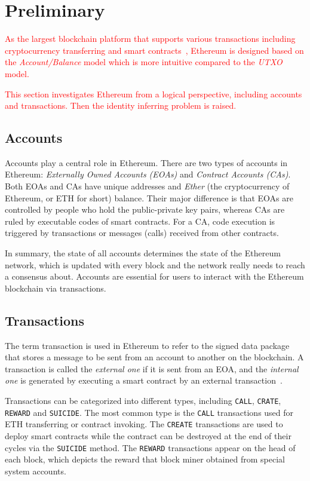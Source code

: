 
\section{Preliminary}
\label{sec:preliminary}
\textcolor{red}{As the largest blockchain platform that supports various transactions including cryptocurrency transferring and smart contracts~\cite{chen2018infocom}, Ethereum is designed based on the \emph{Account/Balance} model which is more intuitive compared to the \emph{UTXO} model.}

\textcolor{red}{This section investigates Ethereum from a logical perspective, including accounts and transactions. Then the identity inferring problem is raised.} 

\subsection{Accounts}
Accounts play a central role in Ethereum. There are two types of accounts in Ethereum: \emph{Externally Owned Accounts (EOAs)} and \emph{Contract Accounts (CAs)}. Both EOAs and CAs have unique addresses and \emph{Ether} (the cryptocurrency of Ethereum, or ETH for short) balance. Their major difference is that EOAs are controlled by people who hold the public-private key pairs, whereas CAs are ruled by executable codes of smart contracts. For a CA, code execution is triggered by transactions or messages (calls) received from other contracts. 

In summary, the state of all accounts determines the state of the Ethereum network, which is updated with every block and the network really needs to reach a consensus about. Accounts are essential for users to interact with the Ethereum blockchain via transactions.
 
 \subsection{Transactions}
 The term transaction is used in Ethereum to refer to the signed data package that stores a message to be sent from an account to another on the blockchain. A transaction is called the \emph{external one} if it is sent from an EOA, and the \emph{internal one} is generated by executing a smart contract by an external transaction~\cite{chen2018infocom}.

Transactions can be categorized into different types, including \texttt{CALL}, \texttt{CRATE}, \texttt{REWARD} and \texttt{SUICIDE}. The most common type is the \texttt{CALL} transactions used for ETH transferring or contract invoking. The \texttt{CREATE} transactions are used to deploy smart contracts while the contract can be destroyed at the end of their cycles via the \texttt{SUICIDE} method. The \texttt{REWARD} transactions appear on the head of each block, which depicts the reward that block miner obtained from special system accounts.

